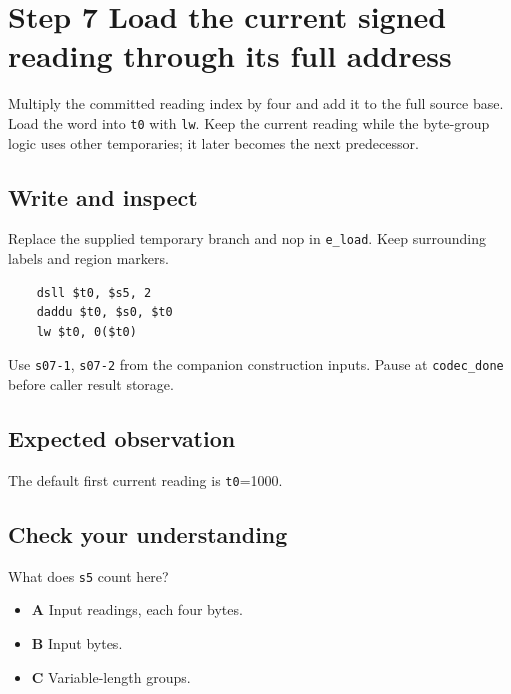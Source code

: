 \section{Step 7 Load the current signed reading through its full address}\label{delta-s07}

Multiply the committed reading index by four and add it to the full source base. Load the word into \texttt{t0} with \texttt{lw}. Keep the current reading while the byte-group logic uses other temporaries; it later becomes the next predecessor.

\subsection{Write and inspect}
Replace the supplied temporary branch and nop in \texttt{e\_load}. Keep surrounding labels and region markers.

\begin{verbatim}
    dsll $t0, $s5, 2
    daddu $t0, $s0, $t0
    lw $t0, 0($t0)
\end{verbatim}
Use \texttt{s07-1}, \texttt{s07-2} from the companion construction inputs. Pause at \texttt{codec\_done} before caller result storage.

\subsection{Expected observation}
The default first current reading is \texttt{t0}=1000.

\subsection{Check your understanding}
What does \texttt{s5} count here?

\begin{itemize}
  \item \textbf{A} Input readings, each four bytes.
  \item \textbf{B} Input bytes.
  \item \textbf{C} Variable-length groups.
\end{itemize}
